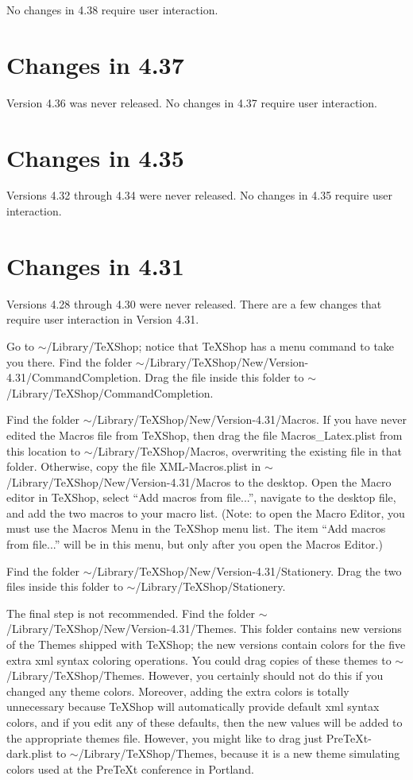 \documentclass[11pt, oneside]{amsart}
\begin{document}
No changes in 4.38 require user interaction.

\section{Changes in 4.37}

Version 4.36 was never released. No changes in 4.37 require user interaction.


\section{Changes in 4.35}

Versions 4.32 through 4.34 were never released. No changes in 4.35 require user interaction.

\section{Changes in 4.31}

Versions 4.28 through 4.30 were never released. There are a few changes that require user interaction in Version 4.31. 

Go to
$\sim$/Library/TeXShop; notice that TeXShop has a menu command to take you there. Find the folder
$\sim$/Library/TeXShop/New/Version-4.31/CommandCompletion. Drag the file inside this folder to $\sim$/Library/TeXShop/CommandCompletion.

Find the folder $\sim$/Library/TeXShop/New/Version-4.31/Macros. If you have never edited the Macros file from TeXShop, then drag the file Macros\_Latex.plist from this location to $\sim$/Library/TeXShop/Macros, overwriting the existing file in that folder. Otherwise, copy the file XML-Macros.plist in $\sim$/Library/TeXShop/New/Version-4.31/Macros to the desktop. Open the Macro editor in TeXShop, select ``Add macros from file...'', navigate to the desktop file, and add the two macros to your macro list. (Note: to open the Macro Editor, you must use the Macros Menu in the TeXShop menu list. The item ``Add macros from file...'' will be in this menu, but only after you open the Macros Editor.)

Find the folder $\sim$/Library/TeXShop/New/Version-4.31/Stationery. Drag the two files inside this folder to $\sim$/Library/TeXShop/Stationery.

The final step is not recommended. Find the folder $\sim$/Library/TeXShop/New/Version-4.31/Themes.
This folder contains new versions of the Themes shipped with TeXShop; the new versions contain colors for the five extra xml syntax coloring operations. You could drag copies of these themes to $\sim$/Library/TeXShop/Themes. However, you certainly should not do this if you changed any theme colors. Moreover, adding the extra colors is totally unnecessary because TeXShop will automatically provide default xml syntax colors, and if you edit any of these defaults, then the new values will be added to the appropriate themes file. However, you might like to drag just PreTeXt-dark.plist to $\sim$/Library/TeXShop/Themes, because it is a new theme simulating colors used at the PreTeXt conference in Portland.
\end{document}
